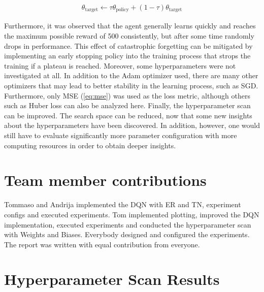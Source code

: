 \documentclass{article}
\begin{document}
\begin{align}
   \label{eq:soft-update}
   \theta_{\text{target}} \leftarrow \tau \theta_{\text{policy}} + (1 - \tau) \theta_{\text{target}}
\end{align}

Furthermore, it was observed that the agent generally learns quickly and reaches the maximum possible reward of 500 consistently, but after some time randomly drops in performance. 
This effect of catastrophic forgetting can be mitigated by implementing an early stopping policy into the training process that strops the training if a plateau is reached.
Moreover, some hyperparameters were not investigated at all. 
In addition to the Adam optimizer used, there are many other optimizers that may lead to better stability in the learning process, such as SGD. 
Furthermore, only MSE (\autoref{eq:mse}) was used as the loss metric, although others such as Huber loss can also be analyzed here.
Finally, the hyperparameter scan can be improved. The search space can be reduced, now that some new insights about the hyperparameters have been discovered. 
In addition, however, one would still have to evaluate significantly more parameter configuration with more computing resources in order to obtain deeper insights.

\newpage
\nocite{DBLP:books/sp/Plaat22}




\appendix
\section{Team member contributions}
Tommaso and Andrija implemented the DQN with ER and TN, experiment configs and executed experiments.
Tom implemented plotting, improved the DQN implementation, executed experiments and conducted the hyperparameter scan with Weights and Biases.
Everybody designed and configured the experiments.
The report was written with equal contribution from everyone.


\section{Hyperparameter Scan Results}
\label{sec:hyperparameter-scan-results}
\end{document}
